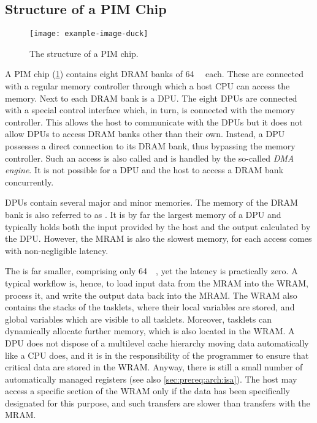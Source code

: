 \subsection{Structure of a \acs*{PIM} Chip}
\label{sec:prereq:arch:structure}

\begin{figure}
	\centering
	\texttt{[image: example-image-duck]}

	\caption{
		The structure of a \ac{PIM} chip.
	}
	\label{fig:arch:chip}
\end{figure}

A \ac{PIM} chip (\cref{fig:arch:chip}) contains eight \ac{DRAM} banks of \qty{64}{\mebi\byte} each.
These are connected with a regular memory controller through which a host \ac{CPU} can access the memory.
Next to each \ac{DRAM} bank is a \ac{DPU}.
The eight \acp{DPU} are connected with a special control interface which, in turn, is connected with the memory controller.
This allows the host to communicate with the \acp{DPU} but it does not allow \acp{DPU} to access \ac{DRAM} banks other than their own.
Instead, a \ac{DPU} possesses a direct connection to its \ac{DRAM} bank, thus bypassing the memory controller.
Such an access is also called  and is handled by the so-called \emph{\ac{DMA} engine}.
It is not possible for a \ac{DPU} and the host to access a \ac{DRAM} bank concurrently.

\Acp{DPU} contain several major and minor memories.
The memory of the \ac{DRAM} bank is also referred to as .
It is by far the largest memory of a \ac{DPU} and typically holds both the input provided by the host and the output calculated by the \ac{DPU}.
However, the \ac{MRAM} is also the slowest memory, for each access comes with non-negligible latency.

The  is far smaller, comprising only \qty{64}{\kibi\byte}, yet the latency is practically zero.
A typical workflow is, hence, to load input data from the \ac{MRAM} into the \ac{WRAM}, process it, and write the output data back into the \ac{MRAM}.
The \ac{WRAM} also contains the stacks of the tasklets, where their local variables are stored, and global variables which are visible to all tasklets.
Moreover, tasklets can dynamically allocate further memory, which is also located in the \ac{WRAM}.
A \ac{DPU} does not dispose of a multilevel cache hierarchy moving data automatically like a \ac{CPU} does, and it is in the responsibility of the programmer to ensure that critical data are stored in the \ac{WRAM}.
Anyway, there is still a small number of automatically managed registers (see also \cref{sec:prereq:arch:isa}).
The host may access a specific section of the \ac{WRAM} only if the data has been specifically designated for this purpose, and such transfers are slower than transfers with the \ac{MRAM}.


